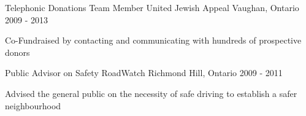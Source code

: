 \begin{cventries}
  \cventry
    {Telephonic Donations Team Member}
    {United Jewish Appeal}
    {Vaughan, Ontario}
    {2009 - 2013}
    {
    \begin{cvitems}
        \item {Co-Fundraised by contacting and communicating with hundreds of prospective donors}
      \end{cvitems}
    }
  \cventry
    {Public Advisor on Safety}
    {RoadWatch}
    {Richmond Hill, Ontario}
    {2009 - 2011}
    {
        \begin{cvitems}
        \item {Advised the general public on the necessity of safe driving to establish a safer neighbourhood}
      \end{cvitems}
    }
\end{cventries}